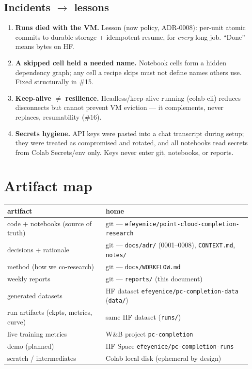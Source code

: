 \documentclass[11pt]{article}
\begin{document}
\subsection*{Incidents $\rightarrow$ lessons}
\begin{enumerate}
  \item \textbf{Runs died with the VM.} Lesson (now policy, ADR-0008): per-unit atomic
  commits to durable storage + idempotent resume, for \emph{every} long job. ``Done''
  means bytes on HF.
  \item \textbf{A skipped cell held a needed name.} Notebook cells form a hidden
  dependency graph; any cell a recipe skips must not define names others use. Fixed
  structurally in \#15.
  \item \textbf{Keep-alive $\neq$ resilience.} Headless/keep-alive running (colab-cli)
  reduces disconnects but cannot prevent VM eviction --- it complements, never replaces,
  resumability (\#16).
  \item \textbf{Secrets hygiene.} API keys were pasted into a chat transcript during
  setup; they were treated as compromised and rotated, and all notebooks read secrets
  from Colab Secrets/env only. Keys never enter git, notebooks, or reports.
\end{enumerate}

\section{Artifact map}\label{app:map}

\begin{center}\small
\begin{tabular}{ll}
\toprule
artifact & home \\
\midrule
code + notebooks (source of truth) & git --- \texttt{efeyenice/point-cloud-completion-research} \\
decisions + rationale & git --- \texttt{docs/adr/} (0001--0008), \texttt{CONTEXT.md}, \texttt{notes/} \\
method (how we co-research) & git --- \texttt{docs/WORKFLOW.md} \\
weekly reports & git --- \texttt{reports/} (this document) \\
generated datasets & HF dataset \texttt{efeyenice/pc-completion-data} (\texttt{data/}) \\
run artifacts (ckpts, metrics, curve) & same HF dataset (\texttt{runs/}) \\
live training metrics & W\&B project \texttt{pc-completion} \\
demo (planned) & HF Space \texttt{efeyenice/pc-completion-runs} \\
scratch / intermediates & Colab local disk (ephemeral by design) \\
\bottomrule
\end{tabular}
\end{center}
\end{document}
